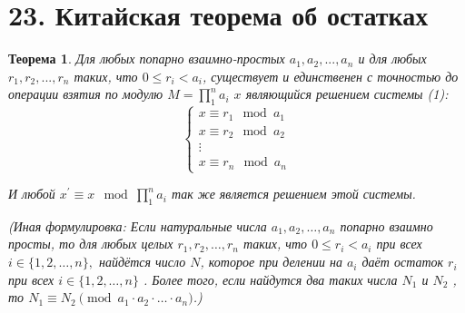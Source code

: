 \documentclass[a4paper,12pt]{article}
\newtheorem*{theorem}{Теорема}
\begin{document}
        \section*{23. Китайская теорема об остатках}
        \begin{theorem}
            Для любых попарно взаимно-простых $a_1, a_2, ..., a_n$ и для любых $r_1, r_2, ..., r_n$ таких, что $0 \leqslant r_i < a_i$, существует и единственен с точностью до операции взятия по модулю $M = \prod_{1}^{n} a_i$ $x$ являющийся решением системы (1): 
            \begin{equation*} 
                   \begin{cases}
                   x \equiv r_1 \mod a_1 \\
                   x \equiv r_2 \mod a_2 \\
                   \vdots
                   \\
                   x \equiv r_n \mod a_n
                   \end{cases}
            \end{equation*}
            
            И любой $x^\prime \equiv x \mod \prod_{1}^{n} a_i$ так же является решением этой системы.

            (Иная формулировка: Если натуральные числа $ a_{1},a_{2},\dots ,a_{n}$  
            попарно взаимно просты, то для любых целых $ r_{1},r_{2},\dots ,r_{n}$ таких, что 
            $ 0\leqslant r_{i}<a_{i}$  при всех $ i\in \{1,2,\dots ,n\},$  найдётся число $N$, 
            которое при делении на $ a_{i}$  даёт остаток $ r_{i}$  при всех $ i\in \{1,2,\dots ,n\}$ . Более того, если найдутся два таких числа $N_{1}$  и $N_{2}$ , то 
            $N_1 \equiv N_2 \pmod{a_1\cdot a_2\cdot \ldots\cdot a_n}$.)
        \end{theorem}
\end{document}

